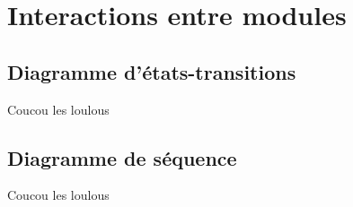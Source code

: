 \section{Interactions entre modules}
    \label{sec:interactions}
    
    \subsection{Diagramme d'états-transitions}
    	Coucou les loulous
    
    \subsection{Diagramme de séquence}
    	Coucou les loulous